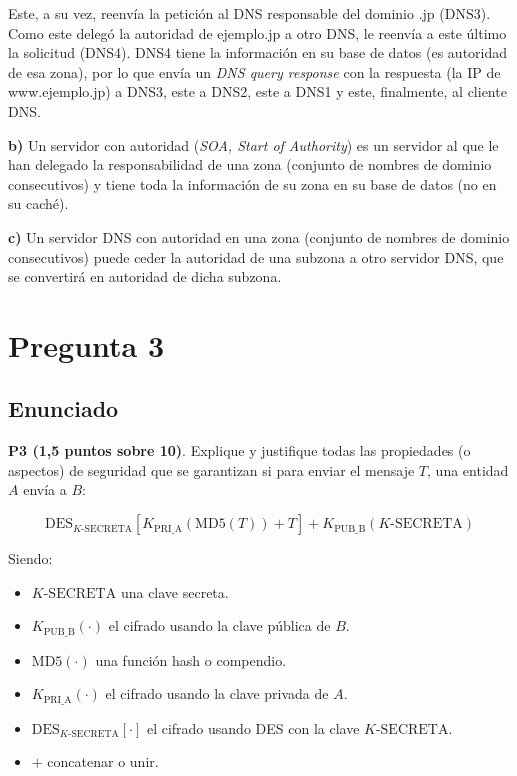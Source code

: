 \documentclass[12pt]{article}
\begin{document}
Este, a su vez, reenvía la petición al DNS responsable del dominio .jp (DNS3). Como este delegó la autoridad de ejemplo.jp a otro DNS, le reenvía a este último la solicitud (DNS4). DNS4 tiene la información en su base de datos (es autoridad de esa zona), por lo que envía un \textit{DNS query response} con la respuesta (la IP de www.ejemplo.jp) a DNS3, este a DNS2, este a DNS1 y este, finalmente, al cliente DNS.

\textbf{b)} Un servidor con autoridad (\textit{SOA, Start of Authority}) es un servidor al que le han delegado la responsabilidad de una zona (conjunto de nombres de dominio consecutivos) y tiene toda la información de su zona en su base de datos (no en su caché).

\textbf{c)} Un servidor DNS con autoridad en una zona (conjunto de nombres de dominio consecutivos) puede ceder la autoridad de una subzona a otro servidor DNS, que se convertirá en autoridad de dicha subzona.


\section{Pregunta 3}

\subsection{Enunciado}

\textbf{P3 (1,5 puntos sobre 10)}. Explique y justifique todas las propiedades (o aspectos) de seguridad que se garantizan si para enviar el mensaje \(T\), una entidad \(A\) envía a \(B\):

\[
\text{DES}_{K\text{-SECRETA}} \left[ K_{\text{PRI\_A}} \left( \text{MD5}(T) \right) + T \right] + K_{\text{PUB\_B}}(K\text{-SECRETA})
\]

Siendo:
\begin{itemize}
    \item \(K\text{-SECRETA}\) una clave secreta.
    \item \(K_{\text{PUB\_B}}(\cdot)\) el cifrado usando la clave pública de \(B\).
    \item \(\text{MD5}(\cdot)\) una función hash o compendio.
    \item \(K_{\text{PRI\_A}}(\cdot)\) el cifrado usando la clave privada de \(A\).
    \item \(\text{DES}_{K\text{-SECRETA}}[\cdot]\) el cifrado usando DES con la clave \(K\text{-SECRETA}\).
    \item \(+\) concatenar o unir.
\end{itemize}
\end{document}
